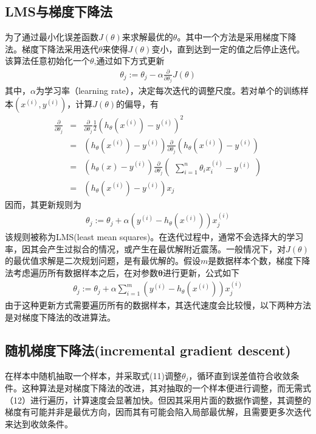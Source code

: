 \subsection{LMS与梯度下降法}
为了通过最小化误差函数$J(\theta)$来求解最优的$\theta$。其中一个方法是采用梯度下降法。梯度下降法采用迭代$\theta$来使得$J(\theta)$变小，直到达到一定的值之后停止迭代。该算法任意初始化一个$\theta$,通过如下方式更新
\begin{eqnarray}
\theta_j := \theta_j-\alpha\frac{\partial}{\partial \theta_j}J(\theta)
\end{eqnarray}
其中，$\alpha$为学习率（learning rate），决定每次迭代的调整尺度。若对单个的训练样本$(x^{(i)},y^{(i)})$，计算$J(\theta)$的偏导，有
\begin{eqnarray}
\frac{\partial}{\partial \theta_j}
&=&\frac{\partial}{\partial \theta_j}\frac{1}{2}(h_\theta(x^{(i)})-y^{(i)})^2\\
&=&(h_\theta(x^{(i)})-y^{(i)})\frac{\partial}{\partial\theta_j}(h_\theta(x^{(i)})-y^{(i)})\\
&=&(h_\theta(x)-y^{(i)})\frac{\partial}{\partial\theta_j}
\left(
\begin{aligned}
\sum_{i=1}^n\theta_ix^{(i)}_i-y^{(i)}
\end{aligned}
\right)\\
&=&(h_\theta(x^{(i)})-y^{(i)})x_j
\end{eqnarray}
因而，其更新规则为
\begin{eqnarray}
\theta_j:=\theta_j+\alpha(y^{(i)}-h_\theta(x^{(i)}))x^{(i)}_j
\end{eqnarray}
该规则被称为LMS(least mean squares)。在迭代过程中，通常不会选择大的学习率，因其会产生过拟合的情况，或产生在最优解附近震荡。一般情况下，对$J(\theta)$的最优值求解是二次规划问题，是有最优解的。假设$m$是数据样本个数，梯度下降法考虑遍历所有数据样本之后，在对参数$\mathbf{\theta}$进行更新，公式如下
\begin{eqnarray}
\theta_j:=\theta_j+\alpha\sum_{i=1}^m(y^{(i)}-h_\theta(x^{(i)}))x_j^{(i)}
\end{eqnarray}
由于这种更新方式需要遍历所有的数据样本，其迭代速度会比较慢，以下两种方法是对梯度下降法的改进算法。
\subsection{随机梯度下降法(incremental gradient descent)}
在样本中随机抽取一个样本，并采取式(11)调整$\theta_j$，循环直到误差值符合收敛条件。这种算法是对梯度下降法的改进，其对抽取的一个样本便进行调整，而无需式（12）进行遍历，计算速度会显著加快。但因其采用片面的数据作调整，其调整的梯度有可能并非是最优方向，因而其有可能会陷入局部最优解，且需要更多次迭代来达到收敛条件。
